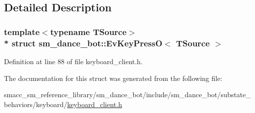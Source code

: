 \subsection{Detailed Description}
\subsubsection*{template$<$typename T\+Source$>$\\*
struct sm\+\_\+dance\+\_\+bot\+::\+Ev\+Key\+Press\+O$<$ T\+Source $>$}



Definition at line 88 of file keyboard\+\_\+client.\+h.



The documentation for this struct was generated from the following file\+:\begin{DoxyCompactItemize}
\item 
smacc\+\_\+sm\+\_\+reference\+\_\+library/sm\+\_\+dance\+\_\+bot/include/sm\+\_\+dance\+\_\+bot/substate\+\_\+behaviors/keyboard/\hyperlink{keyboard__client_8h}{keyboard\+\_\+client.\+h}\end{DoxyCompactItemize}
